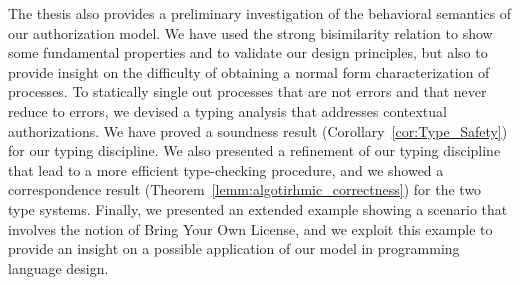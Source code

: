 The thesis also provides a preliminary investigation of the behavioral semantics of our authorization model. We have used the strong bisimilarity relation to show some fundamental properties and to validate our design principles, but also to provide insight on the difficulty 
of obtaining a normal form characterization of processes. 
%
%
To statically single out processes that are not errors and that never reduce to errors, we devised a typing analysis that addresses contextual authorizations. %
We have proved a soundness result (Corollary~\ref{cor:Type_Safety}) for our typing discipline.
We also presented a refinement of our typing discipline that lead to a more efficient type-checking procedure, and we showed a correspondence result (Theorem~\ref{lemm:algotirhmic_correctness}) for the two type systems. 
Finally, we presented an extended example showing a scenario that involves the notion of Bring Your Own License, and we exploit this example to provide an insight on a possible application of our model in programming language design.
%

